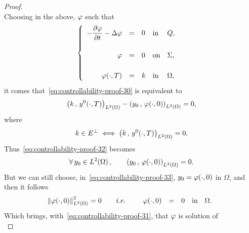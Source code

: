 \begin{proof}
\begin{equation}
    \end{equation}
    Choosing in the above, $\varphi$ such that
    \begin{equation}\label{eq:controllability-proof-31}
        \begin{cases}\displaystyle
            \begin{array}{rclll}
                -\dfrac{\partial{}\varphi}{\partial{}t} - \Delta\varphi & = & 0 & \text{in} & Q,\\
                \\
                \varphi & = & 0 & \text{on} & \Sigma,\\
                \\
                \varphi\!\left({\cdot,T}\right) & = & k & \text{in} &
                \Omega,
            \end{array}
        \end{cases}
    \end{equation}
    it comes that~\eqref{eq:controllability-proof-30} is equivalent to
    \begin{equation}\label{eq:controllability-proof-32}
        \scalaireohm{k}{y^{0}\!\left({\cdot,T}\right)} - \scalaireohm{%
            y_{0}
        }{%
            \vphi\!\left({\cdot,0}\right)
        } = 0,
    \end{equation}
    where
    \begin{equation*}
        k\in E^{\perp}\iff {\left({ k\,,\,y^{0}\!\left({\cdot,T}\right) }\right)}_{L^{2}\left({\Omega}\right)} =
        0.
    \end{equation*}
    Thus~\eqref{eq:controllability-proof-32} becomes
    \begin{equation}\label{eq:controllability-proof-33}
        \forall\,y_{0}\in\Ldeux{\Omega},\qquad \scalaireohm{y_{0}}{%
            \vphi\!\left({\cdot,0}\right)
        } = 0.
    \end{equation}
    But we can still choose, in~\eqref{eq:controllability-proof-33},
    $\displaystyle y_{0} = \varphi\!\left({\cdot,0}\right)$ in $\Omega$, and
    then it follows
    \begin{equation*}
        {\left\|{\varphi\!\left({\cdot,0}\right) }\right\|}_{L^{2}\left({\Omega}\right)}^{2} = 0\qquad\textit{i.e.}\qquad
        \begin{array}{rclll}
            \varphi\!\left({\cdot,0}\right) & = & 0 & \text{in} & \Omega.
        \end{array}
    \end{equation*}
    Which brings, with~\eqref{eq:controllability-proof-31}, that $\varphi$ is
    solution of
    \begin{equation*}

\end{equation*}
\end{proof}
